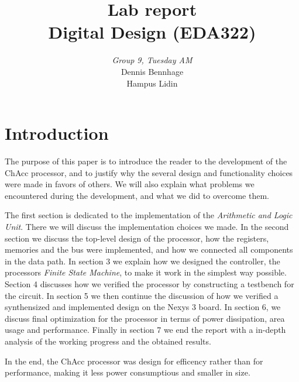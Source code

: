\documentclass[a4,11pt]{article}
\begin{document}
\pagestyle{empty}
\begin{titlepage}

	\title{\Huge{Lab report} \\[0.1cm] \Large{Digital Design (EDA322)} \\[0.4cm]}
	\author{\large{\emph{Group 9, Tuesday AM}} \\[0.2cm] Dennis Bennhage \\[0.05cm] Hampus Lidin \\[0.1cm]}
	\maketitle
	\thispagestyle{empty}
\end{titlepage}
\clearpage
\pagestyle{fancyplain}
\tableofcontents
\clearpage
\setcounter{page}{1}
\section{Introduction}

The purpose of this paper is to introduce the reader to the development of the
ChAcc processor, and to justify why the several design and functionality
choices were made in favors of others. We will also explain what
problems we encountered during the development, and what we did to overcome
them.

The first section is dedicated to the implementation of the {\it Arithmetic and
Logic Unit}. There we will discuss the implementation choices we made. In the
second section we discuss the top-level design of the processor, how the
registers, memories and the bus were implemented, and how we connected all
components in the data path. In section 3 we explain how we designed the
controller, the processors {\it Finite State Machine}, to make it work in the
simplest way possible. Section 4 discusses how we verified the processor by
constructing a testbench for the circuit. In section 5 we then continue the
discussion of how we verified a synthensized and implemented design on the
Nexys 3 board. In section 6, we discuss final optimization for the processor in
terms of power dissipation, area usage and performance. Finally in section 7 we
end the report with a in-depth analysis of the working progress and the
obtained results. 

In the end, the ChAcc processor was design for efficency rather than for
performance, making it less power consumptious and smaller in size.
\end{document}
